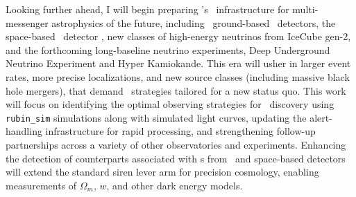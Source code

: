 Looking further ahead, I will begin preparing \Rubin's \ToO\ infrastructure for multi-messenger astrophysics of the future, including \threeG\ ground-based \GW\ detectors, the space-based \GW\ detector \LISA, new classes of high-energy neutrinos from IceCube gen-2, and the forthcoming long-baseline neutrino experiments, Deep Underground Neutrino Experiment and Hyper Kamiokande. This era will usher in larger event rates, more precise localizations, and new source classes (including massive black hole mergers), that demand \ToO\ strategies tailored for a new status quo. This work will focus on identifying the optimal observing strategies for \Rubin\ discovery using \texttt{rubin\_sim} simulations along with simulated light curves, updating the alert-handling infrastructure for rapid processing, and strengthening follow-up partnerships across a variety of other observatories and experiments. Enhancing the detection of counterparts associated with \GW s from \threeG\ and space-based detectors will extend the standard siren lever arm for precision cosmology, enabling measurements of $\Omega_m$, $w$, and other dark energy models.

